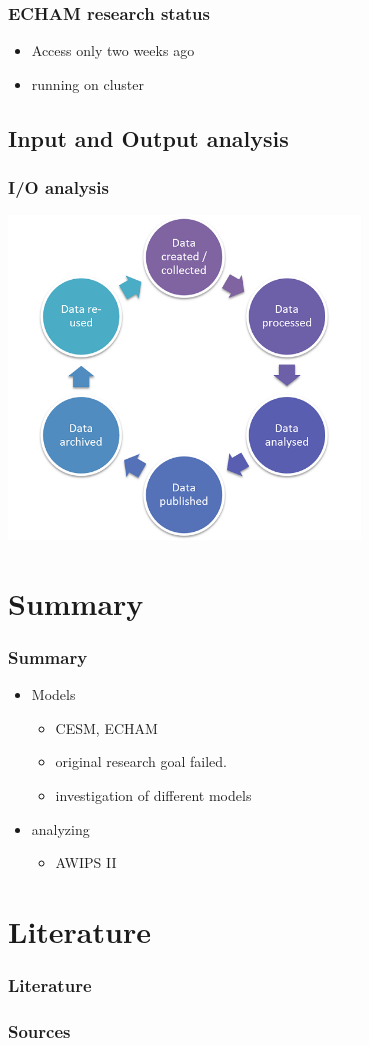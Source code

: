 \documentclass[compress]{beamer}
\begin{document}
\begin{frame}
	\frametitle{ECHAM research status}
	\begin{itemize}
		\item Access only two weeks ago
		\item running on cluster
	\end{itemize}
\end{frame}

\subsection{Input and Output analysis}
\begin{frame}[fragile]
	\frametitle{I/O analysis}
	\begin{center}
	\includegraphics[width=0.7\textwidth]{gfx/DataLifecycle.png}
	\end{center}

\end{frame}


\section{Summary}

\begin{frame}
	\frametitle{Summary}

	\begin{itemize}
		\item Models
		\begin{itemize}
			\item CESM, ECHAM
			\item original research goal failed.
			\item investigation of different models
		\end{itemize}

		\item analyzing
		\begin{itemize}
		    \item AWIPS II
		\end{itemize}
	\end{itemize}
\end{frame}

\section*{Literature}

\begin{frame}[allowframebreaks]
	\frametitle{Literature}
    \frametitle{Sources}

	
	
\end{frame}
\end{document}

